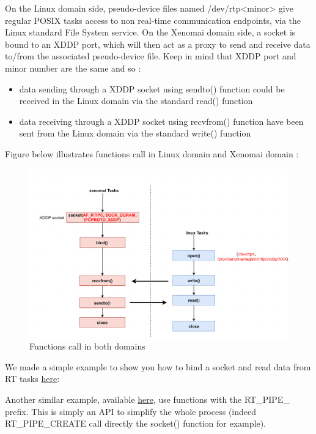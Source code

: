 \documentclass[12pt,hidelinks]{article}
\begin{document}
{	On the Linux domain side, pseudo-device files named /dev/rtp<minor> give regular POSIX tasks access to non real-time communication endpoints, via the Linux standard File System service. 
	\newline On the Xenomai domain side, a socket is bound to an XDDP port, which will then act as a proxy to send and receive data to/from the associated pseudo-device file. Keep in mind that XDDP port and minor number are the same and so :
 
 \begin{itemize}
     \item data sending through a XDDP socket using sendto() function could be received in the Linux domain via the standard read() function
     \item data receiving through a XDDP socket using recvfrom() function have been sent from the Linux domain via the standard write() function
 \end{itemize}
 
 Figure below illustrates functions call in Linux domain and Xenomai domain :
 
     \begin{figure}[ht]
    \hspace{-2cm}
	\includegraphics[scale=0.2]{XDDPhowTo.png}
	\caption{Functions call in both domains}
	\end{figure} \newline
 
 We made a simple example to show you how to bind a socket and read data from RT tasks \href{https://github.com/skyultime/M2_ERTS_Project_Xenomai_edh/tree/dev/SourceCode/xttpProtTemplate}{here}:  
 
 Another similar example, available \href{https://github.com/skyultime/M2_ERTS_Project_Xenomai_edh/tree/dev/SourceCode/XenomaiSideXddpExample}{here}, use functions with the RT\_PIPE\_ prefix. This is simply an API to simplify the whole process (indeed RT\_PIPE\_CREATE call directly the socket() function for example).\newline
 
}
\end{document}
